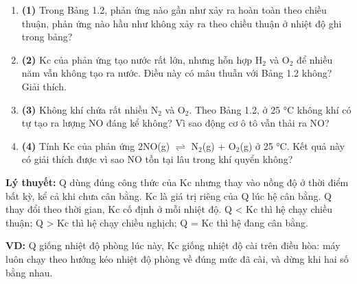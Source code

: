 \qhead
\begin{enumerate}[label={}, leftmargin=0.5em, itemsep=6pt]
\item \textbf{(1)} Trong Bảng 1.2, phản ứng nào gần như xảy ra hoàn toàn theo chiều thuận, phản ứng nào hầu như không xảy ra theo chiều thuận ở nhiệt độ ghi trong bảng? 
\item \textbf{(2)} Kc của phản ứng tạo nước rất lớn, nhưng hỗn hợp H$_{2}$ và O$_{2}$ để nhiều năm vẫn không tạo ra nước. Điều này có mâu thuẫn với Bảng 1.2 không? Giải thích. 
\item \textbf{(3)} Không khí chứa rất nhiều N$_{2}$ và O$_{2}$. Theo Bảng 1.2, ở 25 °C không khí có tự tạo ra lượng NO đáng kể không? Vì sao động cơ ô tô vẫn thải ra NO? 
\item \textbf{(4)} Tính Kc của phản ứng 2NO(g) $\rightleftharpoons$ N$_{2}$(g) + O$_{2}$(g) ở 25 °C. Kết quả này có giải thích được vì sao NO tồn tại lâu trong khí quyển không? 
\end{enumerate}
\textbf{Lý thuyết:} Q dùng đúng công thức của Kc nhưng thay vào nồng độ ở thời điểm bất kỳ, kể cả khi chưa cân bằng. Kc là giá trị riêng của Q lúc hệ cân bằng. Q thay đổi theo thời gian, Kc cố định ở mỗi nhiệt độ. Q < Kc thì hệ chạy chiều thuận; Q > Kc thì hệ chạy chiều nghịch; Q = Kc thì hệ đang cân bằng.

\textbf{VD:} Q giống nhiệt độ phòng lúc này, Kc giống nhiệt độ cài trên điều hòa: máy luôn chạy theo hướng kéo nhiệt độ phòng về đúng mức đã cài, và dừng khi hai số bằng nhau.

